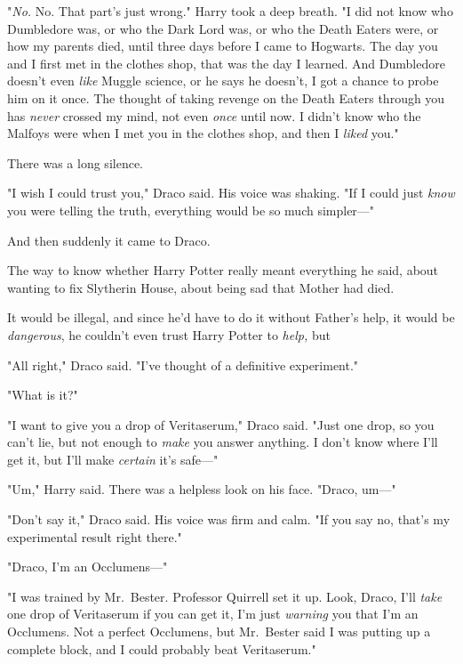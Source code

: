 "\emph{No.} No. That part's just wrong." Harry took a deep breath. "I did not
know who Dumbledore was, or who the Dark Lord was, or who the Death Eaters
were, or how my parents died, until three days before I came to Hogwarts. The
day you and I first met in the clothes shop, that was the day I learned. And
Dumbledore doesn't even \emph{like} Muggle science, or he says he doesn't, I
got a chance to probe him on it once. The thought of taking revenge on the
Death Eaters through you has \emph{never} crossed my mind, not even \emph{once}
until now. I didn't know who the Malfoys were when I met you in the clothes
shop, and then I \emph{liked} you."

There was a long silence.

"I wish I could trust you," Draco said. His voice was shaking. "If I could just
\emph{know} you were telling the truth, everything would be so much simpler\mbox{---}"

And then suddenly it came to Draco.

The way to know whether Harry Potter really meant everything he said, about
wanting to fix Slytherin House, about being sad that Mother had died.

It would be illegal, and since he'd have to do it without Father's help, it
would be \emph{dangerous}, he couldn't even trust Harry Potter to \emph{help,}
but{\el}

"All right," Draco said. "I've thought of a definitive experiment."

"What is it?"

"I want to give you a drop of Veritaserum," Draco said. "Just one drop, so you
can't lie, but not enough to \emph{make} you answer anything. I don't know
where I'll get it, but I'll make \emph{certain} it's safe\mbox{---}"

"Um," Harry said. There was a helpless look on his face. "Draco, um\mbox{---}"

"Don't say it," Draco said. His voice was firm and calm. "If you say no, that's
my experimental result right there."

"Draco, I'm an Occlumens\mbox{---}"

\emph{}

"I was trained by Mr.~Bester. Professor Quirrell set it up. Look, Draco, I'll
\emph{take} one drop of Veritaserum if you can get it, I'm just \emph{warning}
you that I'm an Occlumens. Not a perfect Occlumens, but Mr.~Bester said I was
putting up a complete block, and I could probably beat Veritaserum."

